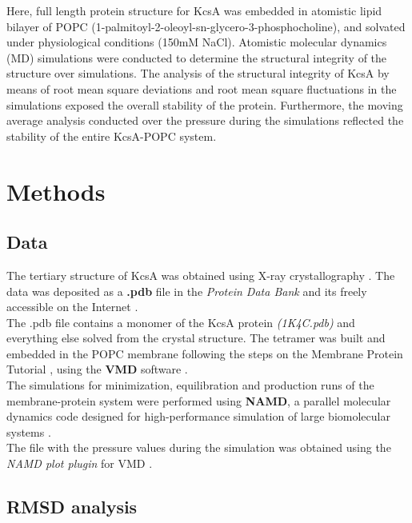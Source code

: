 \documentclass[paper=letter, onecolum, fontsize=12pt]{article}
\begin{document}
Here, full length protein structure for KcsA was embedded in atomistic lipid bilayer of POPC (1-palmitoyl-2-oleoyl-sn-glycero-3-phosphocholine), and solvated under physiological conditions (150mM NaCl). Atomistic molecular dynamics (MD) simulations were conducted to determine the structural integrity of the structure over simulations. The analysis of the structural integrity of KcsA by means of root mean square deviations and root mean square fluctuations in the simulations exposed the overall stability of the protein. Furthermore, the moving average analysis conducted over the pressure during the simulations reflected the stability of the entire KcsA-POPC system.

\section{Methods}

\subsection{Data}
\hspace{4mm} The tertiary structure of KcsA was obtained using X-ray crystallography \cite{doyle1998structure}. The data was deposited as a \textbf{.pdb} file in the \textit{Protein Data Bank} and its freely accessible on the Internet \cite{bank_rcsb_nodate}.\\

The .pdb file contains a monomer of the KcsA protein \textit{(1K4C.pdb)} and everything else solved from the crystal structure. The tetramer was built and embedded in the POPC membrane following the steps on the Membrane Protein Tutorial \cite{aksimentiev_tutorial_nodate}, using the \textbf{VMD} software \cite{humphrey_vmd_1996}.\\

The simulations for minimization, equilibration and production runs of the membrane-protein system were performed using \textbf{NAMD}, a parallel molecular dynamics code designed for high-performance simulation of large biomolecular systems \cite{phillips_namd_2020}.\\

The file with the pressure values during the simulation was obtained using the \textit{NAMD plot plugin} for VMD \cite{noauthor_namd_nodate}.

\subsection{RMSD analysis}
\end{document}
